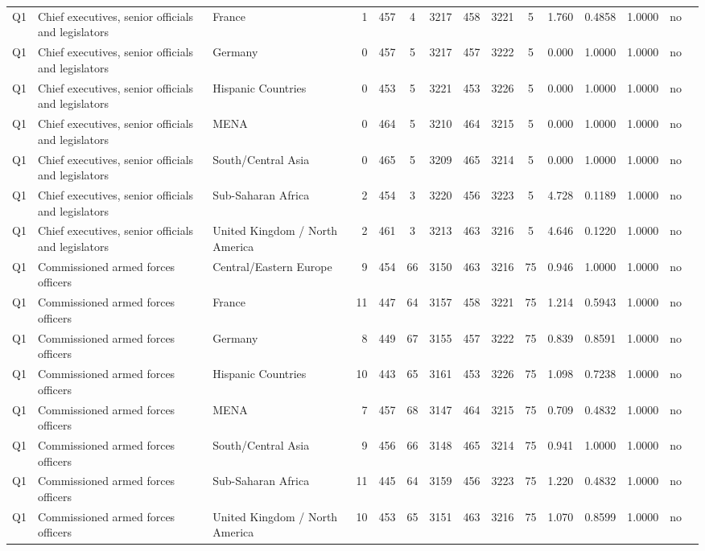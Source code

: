 \begin{longtable}{lllrcccccccccll}
Q1 & Chief executives, senior officials and legislators & France & 1 & 457 & 4 & 3217 & 458 & 3221 & 5 & 1.760 & 0.4858 & 1.0000 & no \\
Q1 & Chief executives, senior officials and legislators & Germany & 0 & 457 & 5 & 3217 & 457 & 3222 & 5 & 0.000 & 1.0000 & 1.0000 & no \\
Q1 & Chief executives, senior officials and legislators & Hispanic Countries & 0 & 453 & 5 & 3221 & 453 & 3226 & 5 & 0.000 & 1.0000 & 1.0000 & no \\
Q1 & Chief executives, senior officials and legislators & MENA & 0 & 464 & 5 & 3210 & 464 & 3215 & 5 & 0.000 & 1.0000 & 1.0000 & no \\
Q1 & Chief executives, senior officials and legislators & South/Central Asia & 0 & 465 & 5 & 3209 & 465 & 3214 & 5 & 0.000 & 1.0000 & 1.0000 & no \\
Q1 & Chief executives, senior officials and legislators & Sub-Saharan Africa & 2 & 454 & 3 & 3220 & 456 & 3223 & 5 & 4.728 & 0.1189 & 1.0000 & no \\
Q1 & Chief executives, senior officials and legislators & United Kingdom / North America & 2 & 461 & 3 & 3213 & 463 & 3216 & 5 & 4.646 & 0.1220 & 1.0000 & no \\
Q1 & Commissioned armed forces officers & Central/Eastern Europe & 9 & 454 & 66 & 3150 & 463 & 3216 & 75 & 0.946 & 1.0000 & 1.0000 & no \\
Q1 & Commissioned armed forces officers & France & 11 & 447 & 64 & 3157 & 458 & 3221 & 75 & 1.214 & 0.5943 & 1.0000 & no \\
Q1 & Commissioned armed forces officers & Germany & 8 & 449 & 67 & 3155 & 457 & 3222 & 75 & 0.839 & 0.8591 & 1.0000 & no \\
Q1 & Commissioned armed forces officers & Hispanic Countries & 10 & 443 & 65 & 3161 & 453 & 3226 & 75 & 1.098 & 0.7238 & 1.0000 & no \\
Q1 & Commissioned armed forces officers & MENA & 7 & 457 & 68 & 3147 & 464 & 3215 & 75 & 0.709 & 0.4832 & 1.0000 & no \\
Q1 & Commissioned armed forces officers & South/Central Asia & 9 & 456 & 66 & 3148 & 465 & 3214 & 75 & 0.941 & 1.0000 & 1.0000 & no \\
Q1 & Commissioned armed forces officers & Sub-Saharan Africa & 11 & 445 & 64 & 3159 & 456 & 3223 & 75 & 1.220 & 0.4832 & 1.0000 & no \\
Q1 & Commissioned armed forces officers & United Kingdom / North America & 10 & 453 & 65 & 3151 & 463 & 3216 & 75 & 1.070 & 0.8599 & 1.0000 & no \\

\end{longtable}

